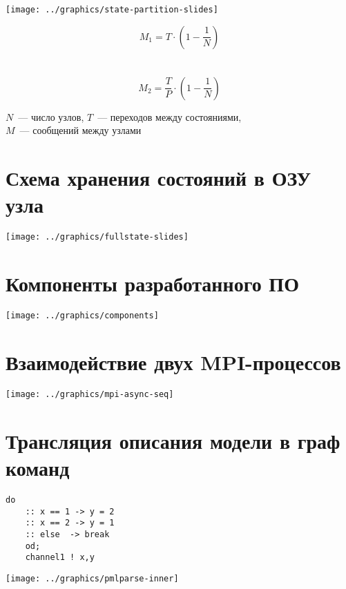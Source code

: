 \documentclass[12pt]{article}
\begin{document}
\begin{minipage}[m]{0.7\linewidth}
  \texttt{[image: ../graphics/state-partition-slides]}  
\end{minipage}
\begin{minipage}[m]{0.3\linewidth}
  $$ M_1 = T \cdot (1 - \frac{1}{N}) $$
  \\ ~ \\
  $$ M_2 = \frac{T}{P} \cdot (1 - \frac{1}{N}) $$
\end{minipage}

\begin{center}
  $N$~--- число узлов, $T$~--- переходов между состояниями, \\
  $M$~--- сообщений между узлами
\end{center}

\section{Схема хранения состояний в ОЗУ узла}
\label{sec:state-store-full}

\begin{center}
  \texttt{[image: ../graphics/fullstate-slides]}
\end{center}

\section{Компоненты разработанного ПО}
\label{sec:component-diag}

\begin{center}
  \texttt{[image: ../graphics/components]}
\end{center}

\section{Взаимодействие двух MPI-процессов}
\label{sec:mpi-sequence}

\begin{center}
  \texttt{[image: ../graphics/mpi-async-seq]}
\end{center}

\section{Трансляция описания модели в граф команд}
\label{sec:pmlparse}

\begin{minipage}[m]{0.35\linewidth}
  \begin{lstlisting}[language=Promela,style=simplecode,numbers=none]
    do
    :: x == 1 -> y = 2
    :: x == 2 -> y = 1
    :: else  -> break
    od;
    channel1 ! x,y
  \end{lstlisting}
\end{minipage}
\begin{minipage}[m]{0.75\linewidth}
  \texttt{[image: ../graphics/pmlparse-inner]}
\end{minipage}
\end{document}
